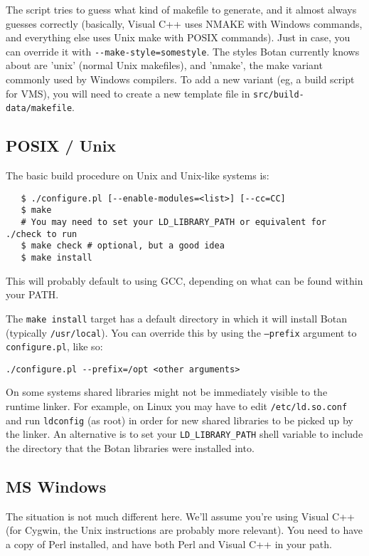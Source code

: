 \documentclass{article}
\newcommand{\filename}[1]{\texttt{#1}}
\begin{document}
The script tries to guess what kind of makefile to generate, and it
almost always guesses correctly (basically, Visual C++ uses NMAKE with
Windows commands, and everything else uses Unix make with POSIX
commands). Just in case, you can override it with
\verb|--make-style=somestyle|. The styles Botan currently knows about
are 'unix' (normal Unix makefiles), and 'nmake', the make variant
commonly used by Windows compilers. To add a new variant (eg, a build
script for VMS), you will need to create a new template file in
\filename{src/build-data/makefile}.

\pagebreak

\subsection{POSIX / Unix}

The basic build procedure on Unix and Unix-like systems is:

\begin{verbatim}
   $ ./configure.pl [--enable-modules=<list>] [--cc=CC]
   $ make
   # You may need to set your LD_LIBRARY_PATH or equivalent for ./check to run
   $ make check # optional, but a good idea
   $ make install
\end{verbatim}

This will probably default to using GCC, depending on what can be
found within your PATH.

The \verb|make install| target has a default directory in which it
will install Botan (typically \verb|/usr/local|). You can override
this by using the \texttt{--prefix} argument to
\filename{configure.pl}, like so:

\verb|./configure.pl --prefix=/opt <other arguments>|

On some systems shared libraries might not be immediately visible to
the runtime linker. For example, on Linux you may have to edit
\filename{/etc/ld.so.conf} and run \texttt{ldconfig} (as root) in
order for new shared libraries to be picked up by the linker. An
alternative is to set your \texttt{LD\_LIBRARY\_PATH} shell variable
to include the directory that the Botan libraries were installed into.

\subsection{MS Windows}

The situation is not much different here. We'll assume you're using Visual C++
(for Cygwin, the Unix instructions are probably more relevant). You need to
have a copy of Perl installed, and have both Perl and Visual C++ in your path.
\end{document}
